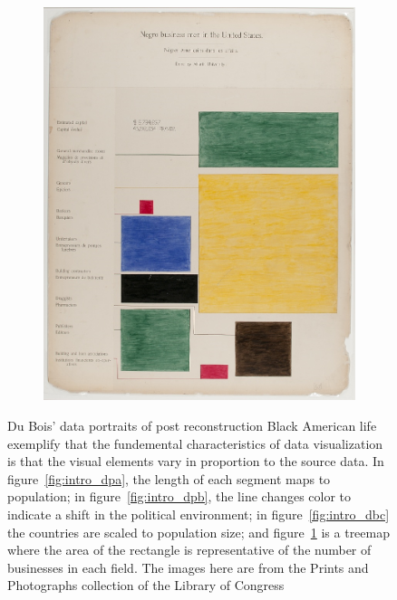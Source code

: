 \documentclass[../main.tex]{subfiles}
\begin{document}
\begin{figure}[H]
\begin{subfigure}{.24\textwidth}
        \includegraphics[width=1\textwidth]{figures/intro/du_bois_heat.png}
        \caption{}
        \label{fig:intro_dbd}
    \end{subfigure}
    \caption{Du Bois' data portraits\cite{duboiscenterattheuniversityofmassachusettsBoisDataPortraits2018} of post reconstruction Black American life exemplify that the fundemental characteristics of data visualization is that the visual elements vary in proportion to the source data. In figure~\ref{fig:intro_dpa}, the length of each segment maps to population; in figure~\ref{fig:intro_dpb}, the line changes color to indicate a shift in the political environment; in figure~\ref{fig:intro_dbc} the countries are scaled to population size; and figure~\ref{fig:intro_dbd} is a treemap where the area of the rectangle is representative of the number of businesses in each field. The images here are from the Prints and Photographs collection of the Library of Congress \cite{duboisGeorgiaNegroCity1900,duboisGeorgiaNegroValuation1900, duboisSeriesStatisticalCharts, duboisSeriesStatisticalChartsa}}
    \label{fig:intro_dubois}
\end{figure}
\end{document}
